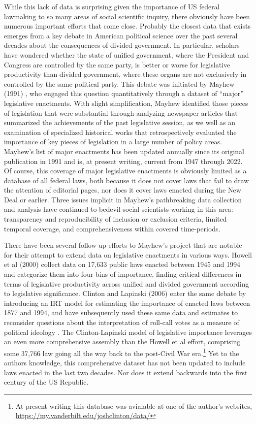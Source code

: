 \documentclass[fleqn,10pt]{wlscirep}
\begin{document}
While this lack of data is surprising given the importance of US federal lawmaking to so many areas of social scientific inquiry, there obviously have been numerous important efforts that come close. Probably the closest data that exists emerges from a key debate in American political science over the past several decades about the consequences of divided government. In particular, scholars have wondered whether the state of unified government, where the President and Congress are controlled by the same party, is better or worse for legislative productivity than divided government, where these organs are not exclusively in controlled by the same political party. This debate was initiated by Mayhew (1991) \nocite{Mayhew1991}, who engaged this question quantitatively through a dataset of ``major'' legislative enactments. With slight simplification, Mayhew identified those pieces of legislation that were substantial through analyzing newspaper articles that summarized the achievements of the past legislative session, as we well as an examination of specialized historical works that retrospectively evaluated the importance of key pieces of legislation in a large number of policy areas. Mayhew's list of major enactments has been updated annually since its original publication in 1991 and is, at present writing, current from 1947 through 2022. Of course, this coverage of major legislative enactments is obviously limited as a database of all federal laws, both because it does not cover laws that fail to draw the attention of editorial pages, nor does it cover laws enacted during the New Deal or earlier.  Three issues implicit in Mayhew's pathbreaking data collection and analysis have continued to bedevil social scientists working in this area: transparency and reproducibility of inclusion or exclusion criteria, limited temporal coverage, and comprehensiveness within covered time-periods.

 There have been several follow-up efforts to Mayhew's project that are notable for their attempt to extend data on legislative enactments in various ways. Howell et al (2000) collect data on 17,633 public laws enacted between 1945 and 1994 and categorize them into four bins of importance, finding critical differences in terms of legislative productivity across unified and divided government according to legislative significance. \cite{Howell2000} Clinton and Lapinski (2006) enter the same debate by introducing an IRT model for estimating the importance of enacted laws between 1877 and 1994,\cite{clinton2006measuring} and have subsequently used these same data and estimates to reconsider questions about the interpretation of roll-call votes as a measure of political ideology \cite{clinton2008laws,lapinski2008,bateman2017}. The Clinton-Lapinski model of legislative importance leverages an even more comprehensive assembly than the Howell et al effort, comprising some 37,766 law going all the way back to the post-Civil War era.\footnote{At present writing this database was avialable at one of the author's websites, \url{https://my.vanderbilt.edu/joshclinton/data/}} Yet to the authors knowledge, this comprehensive dataset has not been updated to include laws enacted in the last two decades. Nor does it extend backwards into the first century of the US Republic.
\end{document}
